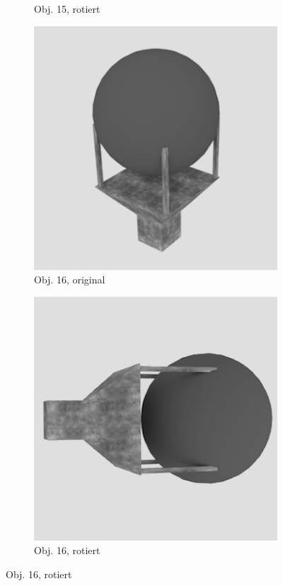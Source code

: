\begin{figure}
\begin{subfigure}{0.2\textwidth}
\caption{Obj. 15, rotiert} \label{fig:d}
\end{subfigure} \hspace{.5cm}%
\begin{subfigure}{0.2\textwidth}
\includegraphics[width=\linewidth]{Bilder/Objekt16A.png}
\caption{Obj. 16, original} \label{fig:e}
\end{subfigure}\hspace{.5cm}
\begin{subfigure}{0.2\textwidth}
\includegraphics[width=\linewidth]{Bilder/Objekt16B.png}
\caption{Obj. 16, rotiert} \label{fig:f}
\end{subfigure}\hspace{.5cm}


\end{figure}

